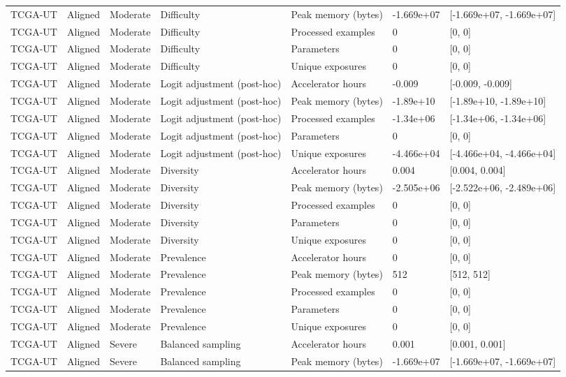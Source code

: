 \begin{longtable}{lllllll}
TCGA-UT & Aligned & Moderate & Difficulty & Peak memory (bytes) & -1.669e+07 & [-1.669e+07, -1.669e+07] \\
TCGA-UT & Aligned & Moderate & Difficulty & Processed examples & 0 & [0, 0] \\
TCGA-UT & Aligned & Moderate & Difficulty & Parameters & 0 & [0, 0] \\
TCGA-UT & Aligned & Moderate & Difficulty & Unique exposures & 0 & [0, 0] \\
TCGA-UT & Aligned & Moderate & Logit adjustment (post-hoc) & Accelerator hours & -0.009 & [-0.009, -0.009] \\
TCGA-UT & Aligned & Moderate & Logit adjustment (post-hoc) & Peak memory (bytes) & -1.89e+10 & [-1.89e+10, -1.89e+10] \\
TCGA-UT & Aligned & Moderate & Logit adjustment (post-hoc) & Processed examples & -1.34e+06 & [-1.34e+06, -1.34e+06] \\
TCGA-UT & Aligned & Moderate & Logit adjustment (post-hoc) & Parameters & 0 & [0, 0] \\
TCGA-UT & Aligned & Moderate & Logit adjustment (post-hoc) & Unique exposures & -4.466e+04 & [-4.466e+04, -4.466e+04] \\
TCGA-UT & Aligned & Moderate & Diversity & Accelerator hours & 0.004 & [0.004, 0.004] \\
TCGA-UT & Aligned & Moderate & Diversity & Peak memory (bytes) & -2.505e+06 & [-2.522e+06, -2.489e+06] \\
TCGA-UT & Aligned & Moderate & Diversity & Processed examples & 0 & [0, 0] \\
TCGA-UT & Aligned & Moderate & Diversity & Parameters & 0 & [0, 0] \\
TCGA-UT & Aligned & Moderate & Diversity & Unique exposures & 0 & [0, 0] \\
TCGA-UT & Aligned & Moderate & Prevalence & Accelerator hours & 0 & [0, 0] \\
TCGA-UT & Aligned & Moderate & Prevalence & Peak memory (bytes) & 512 & [512, 512] \\
TCGA-UT & Aligned & Moderate & Prevalence & Processed examples & 0 & [0, 0] \\
TCGA-UT & Aligned & Moderate & Prevalence & Parameters & 0 & [0, 0] \\
TCGA-UT & Aligned & Moderate & Prevalence & Unique exposures & 0 & [0, 0] \\
TCGA-UT & Aligned & Severe & Balanced sampling & Accelerator hours & 0.001 & [0.001, 0.001] \\
TCGA-UT & Aligned & Severe & Balanced sampling & Peak memory (bytes) & -1.669e+07 & [-1.669e+07, -1.669e+07] \\

\end{longtable}
